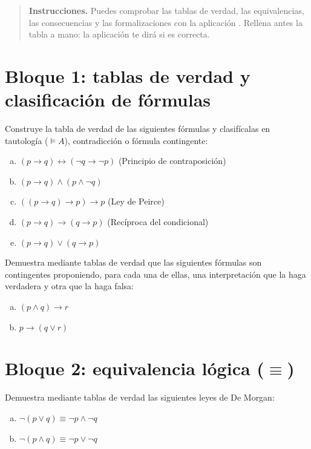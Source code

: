 \begin{quote}
\small \textbf{Instrucciones.} Puedes comprobar las tablas de verdad, las equivalencias, las consecuencias y las formalizaciones con la aplicación \apptablas{}. Rellena antes la tabla a mano: la aplicación te dirá si es correcta.
\end{quote}

\section*{Bloque 1: tablas de verdad y clasificación de fórmulas}

\begin{pregunta}\label{e2-tablas}
Construye la tabla de verdad de las siguientes fórmulas y clasifícalas en tautología ($\models A$), contradicción o fórmula contingente:
\begin{enumerate}[(a)]
    \item $(p \to q) \leftrightarrow (\neg q \to \neg p)$ \hfill (Principio de contraposición)
    \item $(p \to q) \land (p \land \neg q)$
    \item $((p \to q) \to p) \to p$ \hfill (Ley de Peirce)
    \item $(p \to q) \to (q \to p)$ \hfill (Recíproca del condicional)
    \item $(p \to q) \lor (q \to p)$
\end{enumerate}
\end{pregunta}

\begin{pregunta}Demuestra mediante tablas de verdad que las siguientes fórmulas son contingentes proponiendo, para cada una de ellas, una interpretación que la haga verdadera y otra que la haga falsa:
\begin{enumerate}[(a)]
    \item $(p \land q) \to r$
    \item $p \to (q \lor r)$
\end{enumerate}
\end{pregunta}

\section*{Bloque 2: equivalencia lógica (\texorpdfstring{$\equiv$}{equivalencia})}

\begin{pregunta}Demuestra mediante tablas de verdad las siguientes
  leyes de De Morgan: 
\begin{enumerate}[(a)]
    \item $\neg(p \lor q) \equiv \neg p \land \neg q$
    \item $\neg(p \land q) \equiv \neg p \lor \neg q$
\end{enumerate}
\end{pregunta}

